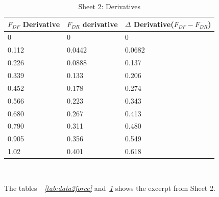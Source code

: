 \documentclass[11pt, a4paper]{article}
\begin{document}
\begin{table}[!ht]
    \centering
    \caption{Sheet 2: Derivatives}
    \begin{tabular}{|l|l|l|}
    \hline
        {$F_{DF}$ Derivative} & {$F_{DR}$ derivative} & {$\Delta$ Derivative($F_{DF}-F_{DR}$)} \\ \hline
        0 & 0 & 0 \\ \hline
        0.112 & 0.0442 & 0.0682 \\ \hline
        0.226 & 0.0888 & 0.137 \\ \hline
        0.339 & 0.133 & 0.206 \\ \hline
        0.452 & 0.178 & 0.274 \\ \hline
        0.566 & 0.223 & 0.343 \\ \hline
        0.680 & 0.267 & 0.413 \\ \hline
        0.790 & 0.311 & 0.480 \\ \hline
        0.905 & 0.356 & 0.549 \\ \hline
        1.02 & 0.401 & 0.618 \\ \hline
    \end{tabular}
~\label{tab:data2_derivatives}
\end{table}

The tables~\textit{~\ref{tab:data2force}} and~\textit{\ref{tab:data2_derivatives}} shows the excerpt from Sheet 2.


\clearpage{}
\end{document}
